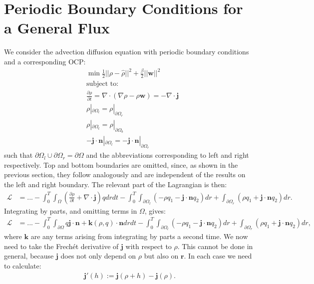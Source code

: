 \documentclass[11pt, a4paper]{article}
\theoremstyle{definition}
\newcommand{\w}{\mathbf{w}}
\newcommand{\n}{\mathbf{n}}
\newcommand{\hr}{\widehat \rho}
\newcommand{\jf}{\mathbf j}
\begin{document}
\section{Periodic Boundary Conditions for a General Flux}

We consider the advection diffusion equation with periodic boundary conditions and a corresponding OCP:
\begin{align*}
	&\min \frac{1}{2}|| \rho - \hr||^2 + \frac{\beta}{2}||\w||^2\\
	&\text{subject to:}\\
	&\frac{\partial \rho}{\partial t} = \nabla \cdot \left(\nabla \rho - \rho \w\right) = -\nabla \cdot \jf\\
	& \rho|_{\partial \Omega_l} = \rho|_{\partial \Omega_r}\\
	& \rho|_{\partial \Omega_t} = \rho|_{\partial \Omega_b}\\
	& - \jf \cdot \n |_{\partial \Omega_l}= - \jf \cdot \n|_{\partial \Omega_r}
\end{align*}
such that $\partial\Omega_l \cup \partial\Omega_r = \partial \Omega$ and the abbreviations corresponding to left and right respectively. Top and bottom boundaries are omitted, since, as shown in the previous section, they follow analogously and are independent of the results on the left and right boundary.
The relevant part of the Lagrangian is then:
\begin{align*}
	\mathcal{L} &= ... -\int_0^T \int_\Omega \left(\frac{\partial \rho}{\partial t} + \nabla \cdot \jf\right)q dr dt - \int_0^T \int_{\partial \Omega_l} \left(- \rho q_1 - \jf \cdot \n q_2 \right) dr  + \int_{\partial \Omega_r} \left(\rho q_1 +  \jf \cdot \n q_2  \right)  dr .
\end{align*}
Integrating by parts, and omitting terms in $\Omega$, gives:
\begin{align*}
	\mathcal{L} &= ... - \int_0^T \int_{\partial \Omega} q \jf  \cdot \n + \mathbf{k}(\rho, q) \cdot \n  dr dt - \int_0^T \int_{\partial \Omega_l} \left(- \rho q_1 - \jf \cdot \n q_2 \right)   dr  + \int_{\partial \Omega_r} \left(\rho q_1 + \jf \cdot \n q_2 \right)   dr, 
\end{align*}
where $\mathbf{k}$ are any terms arising from integrating by parts a second time.
We now need to take the Frech\'et derivative of $\jf$ with respect to $\rho$. This cannot be done in general, because $\jf$ does not only depend on $\rho$ but also on $\mathbf r$. In each case we need to calculate:
\begin{align*}
	\jf'(h) := \jf (\rho + h) - \jf (\rho).
\end{align*}
\end{document}
